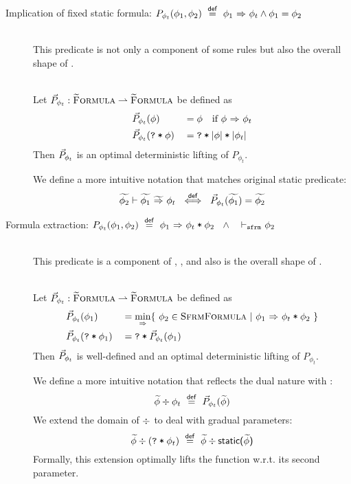 \begin{description}
    \item[Implication of fixed static formula: $P_{\phi_t}(\phi_1, \phi_2) ~\defeq~ \phiImplies{\phi_1}{\phi_t} \wedge \phi_1 = \phi_2$]~\\
    This predicate is not only a component of some rules but also the overall shape of .
    \begin{lemma}~\\
        Let $\dgrad{P}_{\phi_t} : \setGFormula \rightharpoonup \setGFormula$ be defined as
        \begin{alignat*}{2}
        & \dgrad{P}_{\phi_t}(\phi)          & &= \phi  \quad\text{if } \phiImplies{\phi}{\phi_t} \\
        & \dgrad{P}_{\phi_t}(\withqm{\phi}) & &= \withqm{\phiCons{\norms{\phi}}{\norms{\phi_t}}}
        \end{alignat*}
        Then $\dgrad{P}_{\phi_t}$ is an optimal deterministic lifting of $P_{\phi_t}$.
    \end{lemma}
    We define a more intuitive notation that matches original static predicate:
    \begin{displaymath}
    \gphiImpliesEv{\grad{\phi_1}}{\phi_t}{\grad{\phi_2}} ~\defiff~ \dgrad{P}_{\phi_t}(\grad{\phi_1}) = \grad{\phi_2}
    \end{displaymath}
    
    \item[Formula extraction: $P_{\phi_t}(\phi_1, \phi_2) ~\defeq~ \phiImplies{\phi_1}{\phiCons{$\phi_t$}{$\phi_2$}} ~~\wedge~~ \sfrmphi \phi_2$]~\\
    This predicate is a component of , ,  and also is the overall shape of .
    \begin{lemma}~\\
        Let $\dgrad{P}_{\phi_t} : \setGFormula \rightharpoonup \setGFormula$ be defined as
        \begin{alignat*}{2}
        & \dgrad{P}_{\phi_t}(\phi_1)          & &= \underset{\phiImplies{}{}}{\min} \{~ \phi_2 \in \setFormulaB ~|~ \phiImplies{\phi_1}{\phiCons{$\phi_t$}{$\phi_2$}} ~\} \\
        & \dgrad{P}_{\phi_t}(\withqm{\phi_1}) & &= \withqm{\dgrad{P}_{\phi_t}(\phi_1)}
        \end{alignat*}
        Then $\dgrad{P}_{\phi_t}$ is well-defined and an optimal deterministic lifting of $P_{\phi_t}$.
    \end{lemma}
    We define a more intuitive notation that reflects the dual nature with \ttt{*}:
    \begin{displaymath}
    \wo{\grad{\phi}}{\phi_t} ~\defeq~ \dgrad{P}_{\phi_t}(\grad{\phi})
    \end{displaymath}
    We extend the domain of $\wo{}{}$ to deal with gradual parameters:
    \begin{displaymath}
    \wo{\grad{\phi}}{(\withqm{\phi_t})} ~\defeq~ \wo{\grad{\phi}}{\static{$\grad{\phi}$}}
    \end{displaymath}
    Formally, this extension optimally lifts the function w.r.t. its second parameter.
    

\end{description}

